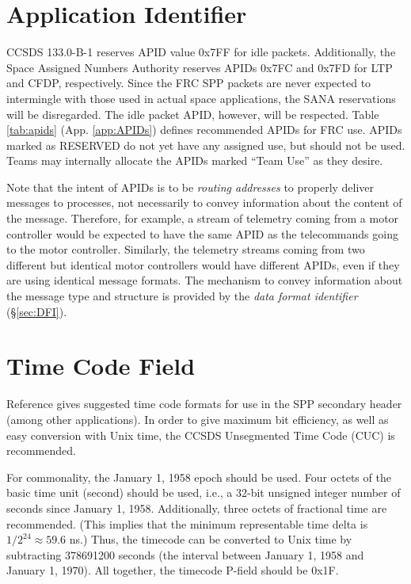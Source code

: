 \documentclass[12pt]{article}
\begin{document}
\section{Application Identifier}
\par CCSDS 133.0-B-1 reserves APID value 0x7FF for idle packets. Additionally, the Space Assigned Numbers Authority reserves APIDs 0x7FC and 0x7FD for LTP and CFDP, respectively. Since the FRC SPP packets are never expected to intermingle with those used in actual space applications, the SANA reservations will be disregarded. The idle packet APID, however, will be respected. Table \ref{tab:apids} (App. \ref{app:APIDs}) defines recommended APIDs for FRC use. APIDs marked as RESERVED do not yet have any assigned use, but should not be used. Teams may internally allocate the APIDs marked ``Team Use'' as they desire. 
\par Note that the intent of APIDs is to be \textit{routing addresses} to properly deliver messages to processes, not necessarily to convey information about the content of the message. Therefore, for example, a stream of telemetry coming from a motor controller would be expected to have the same APID as the telecommands going to the motor controller. Similarly, the telemetry streams coming from two different but identical motor controllers would have different APIDs, even if they are using identical message formats. The mechanism to convey information about the message type and structure is provided by the \textit{data format identifier} (\S \ref{sec:DFI}).

\section{Time Code Field}
\label{sec:TC}
\par Reference \cite{TCF} gives suggested time code formats for use in the SPP secondary header (among other applications). In order to give maximum bit efficiency, as well as easy conversion with Unix time, the CCSDS Unsegmented Time Code (CUC) is recommended.
\par For commonality, the January 1, 1958 epoch should be used. Four octets of the basic time unit (second) should be used, i.e., a 32-bit unsigned integer number of seconds since January 1, 1958. Additionally, three octets of fractional time are recommended. (This implies that the minimum representable time delta is $1/2^{24}\approx 59.6$ ns.) Thus, the timecode can be converted to Unix time by subtracting 378691200 seconds (the interval between January 1, 1958 and January 1, 1970). All together, the timecode P-field should be 0x1F.
\end{document}
